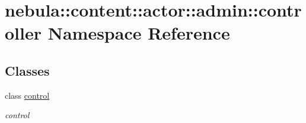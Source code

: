\hypertarget{namespacenebula_1_1content_1_1actor_1_1admin_1_1controller}{
\section{nebula::content::actor::admin::controller Namespace Reference}
\label{namespacenebula_1_1content_1_1actor_1_1admin_1_1controller}
}
\subsection*{Classes}
\begin{DoxyCompactItemize}
\item 
class \hyperlink{classnebula_1_1content_1_1actor_1_1admin_1_1controller_1_1control}{control}
\begin{DoxyCompactList}\small\item\em control \item\end{DoxyCompactList}\end{DoxyCompactItemize}
